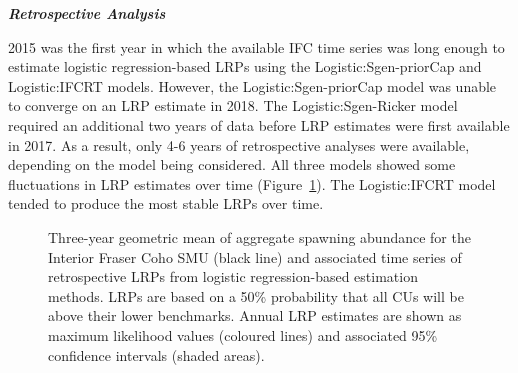 \documentclass[11pt]{book}
\begin{document}
\textbf{\emph{Retrospective Analysis}}

2015 was the first year in which the available IFC time series was long enough to estimate logistic regression-based LRPs using the Logistic:Sgen-priorCap and Logistic:IFCRT models. However, the Logistic:Sgen-priorCap model was unable to converge on an LRP estimate in 2018. The Logistic:Sgen-Ricker model required an additional two years of data before LRP estimates were first available in 2017. As a result, only 4-6 years of retrospective analyses were available, depending on the model being considered. All three models showed some fluctuations in LRP estimates over time (Figure~\ref{fig:coho-retroLRPs}). The Logistic:IFCRT model tended to produce the most stable LRPs over time.
\begin{figure}[htb]

{\centering {} 

}

\caption{Three-year geometric mean of aggregate spawning abundance for the Interior Fraser Coho SMU (black line) and associated time series of retrospective LRPs from logistic regression-based estimation methods. LRPs are based on a 50\% probability that all CUs will be above their lower benchmarks. Annual LRP estimates are shown as maximum likelihood values (coloured lines) and associated 95\% confidence intervals (shaded areas).}\label{fig:coho-retroLRPs}
\end{figure}
\linebreak
\end{document}
